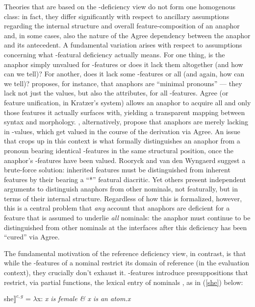 \documentclass[output=paper, modfonts, nonflat]{langsci/langscibook}
\begin{document}
  Theories that are based on the \ph-deficiency view do not form one
  homogenous class: in fact, they differ significantly with respect to
  ancillary assumptions regarding the internal structure and overall
  feature-composition of an anaphor and, in some cases, also the
  nature of the Agree dependency between the anaphor and its
  antecedent. A fundamental variation arises with respect to
  assumptions concerning what \ph-featural deficiency actually
  means. For one thing, is the anaphor simply unvalued for
  \ph-features or does it lack them altogether (and how can we tell)?
  For another, does it lack some \ph-features or all (and again, how
  can we tell)?  \citet{kratzer:2009} proposes, for instance, that
  anaphors are ``minimal pronouns'' --- they lack not just the values,
  but also the attributes, for all \ph-features. Agree (or feature
  unification, in Kratzer's system) allows an anaphor to acquire all
  and only those features it actually surfaces with, yielding a
  transparent mapping between syntax and
  morphology. \citet{roorwyn:2011}, alternatively, propose that
  anaphors are merely lacking in \ph-values, which get valued in the
  course of the derivation via Agree. An issue that crops up in this
  context is what formally distinguishes an anaphor from a pronoun
  bearing identical \ph-features in the same structural position, once
  the anaphor's \ph-features have been valued. Rooryck and van den
  Wyngaerd suggest a brute-force solution: inherited features must be
  distinguished from inherent features by their bearing a ``*''
  featural diacritic. Yet others \citep{heinat:2008,reuland:2001,
    Reuland:2011, dechainewiltschko:2012} present independent
  arguments to distinguish anaphors from other nominals, not
  featurally, but in terms of their internal structure. Regardless of
  how this is formalized, however, this is a central problem that
  \textit{any} account that anaphors are deficient for a feature that is
  assumed to underlie \textit{all} nominals: the anaphor must continue
  to be distinguished from other nominals at the interfaces after this
  deficiency has been ``cured'' via Agree.

  The fundamental motivation of the reference deficiency view, in
  contrast, is that while the \ph-features of a nominal restrict its
  domain of reference (in the evaluation context), they crucially
  don't exhaust it. \ph-features introduce presuppositions that
  restrict, via partial functions, the lexical entry of nominals
  \citep{heimkratzer:1998}, as in (\ref{she}) below:
\begin{exe}  
\ex {$\llbracket$}she$\rrbracket^{c,g}$ = $\lambda$x: \textit{x is female \& x is an atom.x} \label{she}
\end{exe}
\end{document}
